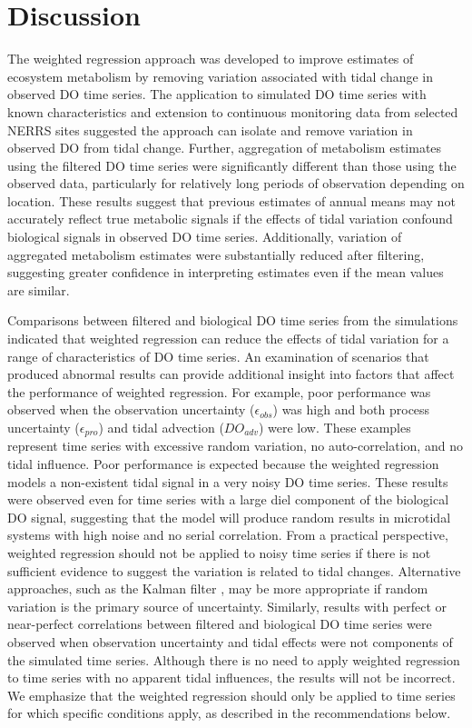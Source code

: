 \documentclass[letterpaper,12pt,oneside]{article}\usepackage[]{graphicx}\usepackage[]{color}
\begin{document}
 

\section{Discussion}

The weighted regression approach was developed to improve estimates of ecosystem metabolism by removing variation associated with tidal change in observed \ac{DO} time series.  The application to simulated \ac{DO} time series with known characteristics and extension to continuous monitoring data from selected \ac{NERRS} sites suggested the approach can isolate and remove variation in observed \ac{DO} from tidal change.  Further, aggregation of metabolism estimates using the filtered \ac{DO} time series were significantly different than those using the observed data, particularly for relatively long periods of observation depending on location. These results suggest that previous estimates of annual means may not accurately reflect true metabolic signals if the effects of tidal variation confound biological signals in observed \ac{DO} time series.  Additionally, variation of aggregated metabolism estimates were substantially reduced after filtering, suggesting greater confidence in interpreting estimates even if the mean values are similar.

Comparisons between filtered and biological \ac{DO} time series from the simulations indicated that weighted regression can reduce the effects of tidal variation for a range of characteristics of \ac{DO} time series.  An examination of scenarios that produced abnormal results can provide additional insight into factors that affect the performance of weighted regression.  For example, poor performance was observed when the observation uncertainty ($\epsilon_{obs}$) was high and both process uncertainty ($\epsilon_{pro}$) and tidal advection ($DO_{adv}$) were low.  These examples represent time series with excessive random variation, no auto-correlation, and no tidal influence.  Poor performance is expected because the weighted regression models a non-existent tidal signal in a very noisy \ac{DO} time series.  These results were observed even for time series with a large diel component of the biological \ac{DO} signal, suggesting that the model will produce random results in microtidal systems with high noise and no serial correlation.  From a practical perspective, weighted regression should not be applied to noisy time series if there is not sufficient evidence to suggest the variation is related to tidal changes.  Alternative approaches, such as the Kalman filter \citep{Harvey89,Batt12}, may be more appropriate if random variation is the primary source of uncertainty.  Similarly, results with perfect or near-perfect correlations between filtered and biological \ac{DO} time series were observed when observation uncertainty and tidal effects were not components of the simulated time series.  Although there is no need to apply weighted regression to time series with no apparent tidal influences, the results will not be incorrect.  We emphasize that the weighted regression should only be applied to time series for which specific conditions apply, as described in the recommendations below.  
\end{document}
